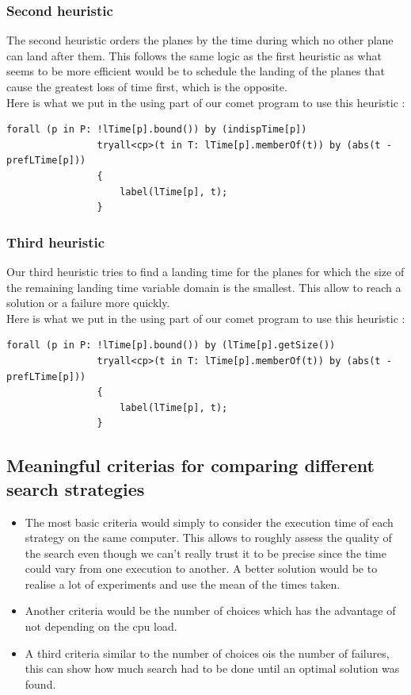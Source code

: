\documentclass{eplDoc}
\begin{document}
\subsubsection{Second heuristic}
The second heuristic orders the planes by the time during which no other plane can land after them. This follows the same logic as the first heuristic as what seems to be more efficient would be to schedule the landing of the planes that cause the greatest loss of time first, which is the opposite. \\ 
Here is what we put in the using part of our comet program to use this heuristic : 
\begin{lstlisting}
forall (p in P: !lTime[p].bound()) by (indispTime[p])
                tryall<cp>(t in T: lTime[p].memberOf(t)) by (abs(t - prefLTime[p]))
                {
                    label(lTime[p], t);
                } 
\end{lstlisting}
\subsubsection{Third heuristic}
Our third heuristic tries to find a landing time for the planes for which the size of the remaining landing time variable domain is the smallest. This allow to reach a solution or a failure more quickly. \\ 
Here is what we put in the using part of our comet program to use this heuristic : 
\begin{lstlisting}
forall (p in P: !lTime[p].bound()) by (lTime[p].getSize())
                tryall<cp>(t in T: lTime[p].memberOf(t)) by (abs(t - prefLTime[p]))
                {
                    label(lTime[p], t);
                } 
\end{lstlisting}

\subsection{Meaningful criterias for comparing different search strategies}

\begin{itemize}
	\item The most basic criteria would simply to consider the execution time of each strategy on the same computer. This allows to roughly assess the quality of the search even though we can't really trust it to be precise since the time could vary from one execution to another. A better solution would be to realise a lot of experiments and use the mean of the times taken. 
	\item Another criteria would be the number of choices which has the advantage of not depending on the cpu load. 
	\item A third criteria similar to the number of choices ois the number of failures, this can show how much search had to be done until an optimal solution was found. 
	
	
\end{itemize}
\end{document}
